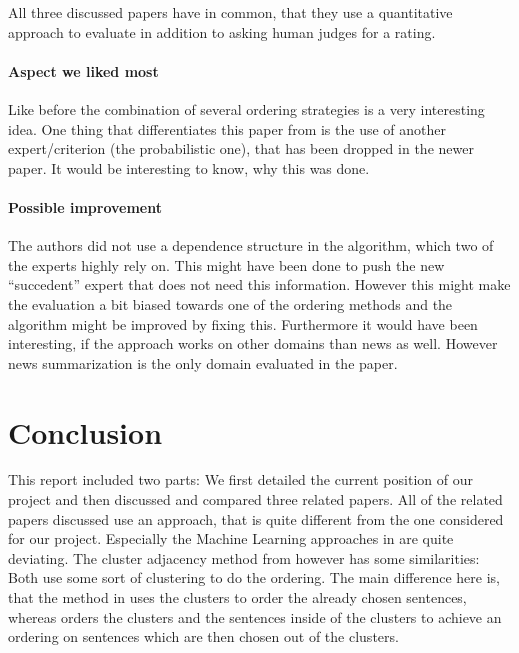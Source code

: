 \documentclass[11pt]{article}
\begin{document}
All three discussed papers have in common, that they use a quantitative approach to evaluate in
addition to asking human judges for a rating.
\paragraph{Aspect we liked most} Like before the combination of several ordering strategies is a
very interesting idea. One thing that differentiates this paper from \cite{Bollegala201089} is the
use of another expert/criterion (the probabilistic one), that has been dropped in the newer paper.
It would be interesting to know, why this was done.
\paragraph{Possible improvement} The authors did not use a dependence structure in the algorithm,
which two of the experts highly rely on. This might have been done to push the new ``succedent''
expert that does not need this information. However this might make the evaluation a bit biased
towards one of the ordering methods and the algorithm might be improved by fixing this. Furthermore
it would have been interesting, if the approach works on other domains than news as well. However
news summarization is the only domain evaluated in the paper.
\section{Conclusion}
This report included two parts: We first detailed the current position of our project and then
discussed and compared three related papers. All of the related papers discussed use an approach,
that is quite different from the one considered for our project. Especially the Machine Learning
approaches in \cite{BollegalaOI05,Bollegala201089} are quite deviating. The cluster adjacency method
from \cite{DonghongY08} however has some similarities: Both use some sort of clustering to do the
ordering. The main difference here is, that the method in \cite{DonghongY08} uses the clusters to
order the already chosen sentences, whereas \cite{BarzilayEM02} orders the clusters and the
sentences inside of the clusters to achieve an ordering on sentences which are then chosen out of
the clusters.


\end{document}
